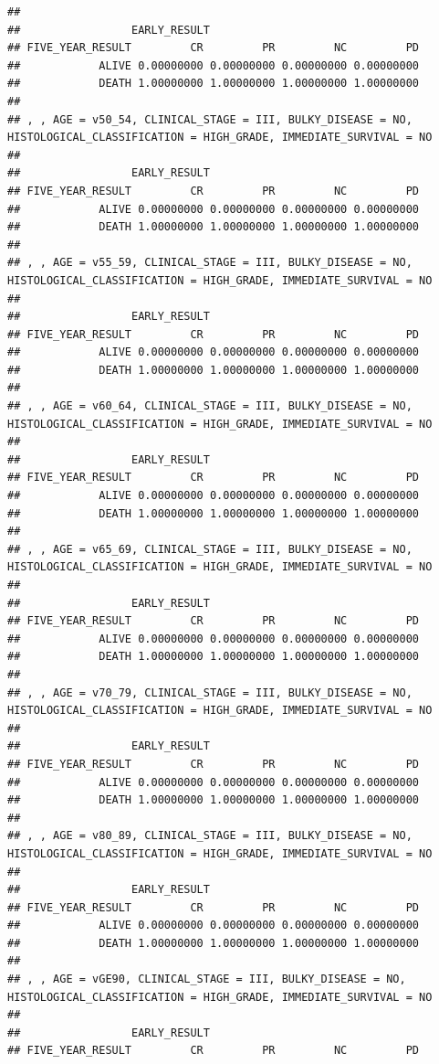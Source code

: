 \documentclass[]{article}
\begin{document}
\begin{verbatim}
## 
##                 EARLY_RESULT
## FIVE_YEAR_RESULT         CR         PR         NC         PD
##            ALIVE 0.00000000 0.00000000 0.00000000 0.00000000
##            DEATH 1.00000000 1.00000000 1.00000000 1.00000000
## 
## , , AGE = v50_54, CLINICAL_STAGE = III, BULKY_DISEASE = NO, HISTOLOGICAL_CLASSIFICATION = HIGH_GRADE, IMMEDIATE_SURVIVAL = NO
## 
##                 EARLY_RESULT
## FIVE_YEAR_RESULT         CR         PR         NC         PD
##            ALIVE 0.00000000 0.00000000 0.00000000 0.00000000
##            DEATH 1.00000000 1.00000000 1.00000000 1.00000000
## 
## , , AGE = v55_59, CLINICAL_STAGE = III, BULKY_DISEASE = NO, HISTOLOGICAL_CLASSIFICATION = HIGH_GRADE, IMMEDIATE_SURVIVAL = NO
## 
##                 EARLY_RESULT
## FIVE_YEAR_RESULT         CR         PR         NC         PD
##            ALIVE 0.00000000 0.00000000 0.00000000 0.00000000
##            DEATH 1.00000000 1.00000000 1.00000000 1.00000000
## 
## , , AGE = v60_64, CLINICAL_STAGE = III, BULKY_DISEASE = NO, HISTOLOGICAL_CLASSIFICATION = HIGH_GRADE, IMMEDIATE_SURVIVAL = NO
## 
##                 EARLY_RESULT
## FIVE_YEAR_RESULT         CR         PR         NC         PD
##            ALIVE 0.00000000 0.00000000 0.00000000 0.00000000
##            DEATH 1.00000000 1.00000000 1.00000000 1.00000000
## 
## , , AGE = v65_69, CLINICAL_STAGE = III, BULKY_DISEASE = NO, HISTOLOGICAL_CLASSIFICATION = HIGH_GRADE, IMMEDIATE_SURVIVAL = NO
## 
##                 EARLY_RESULT
## FIVE_YEAR_RESULT         CR         PR         NC         PD
##            ALIVE 0.00000000 0.00000000 0.00000000 0.00000000
##            DEATH 1.00000000 1.00000000 1.00000000 1.00000000
## 
## , , AGE = v70_79, CLINICAL_STAGE = III, BULKY_DISEASE = NO, HISTOLOGICAL_CLASSIFICATION = HIGH_GRADE, IMMEDIATE_SURVIVAL = NO
## 
##                 EARLY_RESULT
## FIVE_YEAR_RESULT         CR         PR         NC         PD
##            ALIVE 0.00000000 0.00000000 0.00000000 0.00000000
##            DEATH 1.00000000 1.00000000 1.00000000 1.00000000
## 
## , , AGE = v80_89, CLINICAL_STAGE = III, BULKY_DISEASE = NO, HISTOLOGICAL_CLASSIFICATION = HIGH_GRADE, IMMEDIATE_SURVIVAL = NO
## 
##                 EARLY_RESULT
## FIVE_YEAR_RESULT         CR         PR         NC         PD
##            ALIVE 0.00000000 0.00000000 0.00000000 0.00000000
##            DEATH 1.00000000 1.00000000 1.00000000 1.00000000
## 
## , , AGE = vGE90, CLINICAL_STAGE = III, BULKY_DISEASE = NO, HISTOLOGICAL_CLASSIFICATION = HIGH_GRADE, IMMEDIATE_SURVIVAL = NO
## 
##                 EARLY_RESULT
## FIVE_YEAR_RESULT         CR         PR         NC         PD

\end{verbatim}
\end{document}
